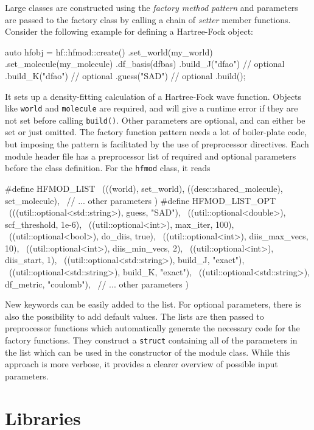 Large classes are constructed using the \emph{factory method pattern} and parameters are passed to the factory class by calling a chain of \emph{setter} member functions. Consider the following example for defining a Hartree-Fock object:
\begin{cppinline}
auto hfobj = hf::hfmod::create()				 
 .set_world(my_world)
 .set_molecule(my_molecule)
 .df_basis(dfbas) 
 .build_J("dfao") // optional
 .build_K("dfao") // optional
 .guess("SAD")    // optional
 .build();
\end{cppinline}
\noindent It sets up a density-fitting calculation of a Hartree-Fock wave function. Objects like \texttt{world} and \texttt{molecule} are required, and will give a runtime error if they are not set before calling \texttt{build()}. Other parameters are optional, and can either be set or just omitted. The factory function pattern needs a lot of boiler-plate code, but imposing the pattern is facilitated by the use of preprocessor directives. Each module header file has a preprocessor list of required and optional parameters before the class definition. For the \texttt{hfmod} class, it reads
\begin{cppinline}
#define HFMOD_LIST \
  (((world), set_world), 
   ((desc::shared_molecule), set_molecule), \
   // ... other parameters
  )
#define HFMOD_LIST_OPT \
  (((util::optional<std::string>), guess, "SAD"), \
   ((util::optional<double>), scf_threshold, 1e-6), \
   ((util::optional<int>), max_iter, 100), \
   ((util::optional<bool>), do_diis, true), \
   ((util::optional<int>), diis_max_vecs, 10), \
   ((util::optional<int>), diis_min_vecs, 2), \
   ((util::optional<int>), diis_start, 1), \
   ((util::optional<std::string>), build_J, "exact"), \
   ((util::optional<std::string>), build_K, "exact"), \
   ((util::optional<std::string>), df_metric, "coulomb"), \
   // ... other parameters
   )
\end{cppinline}

\noindent New keywords can be easily added to the list. For optional parameters, there is also the possibility to add default values. The lists are then passed to preprocessor functions which automatically generate the necessary code for the factory functions. They construct a \texttt{struct} containing all of the parameters in the list which can be used in the constructor of the module class. While this approach is more verbose, it provides a clearer overview of possible input parameters. 

\section{Libraries \label{sec:LIBS}}

